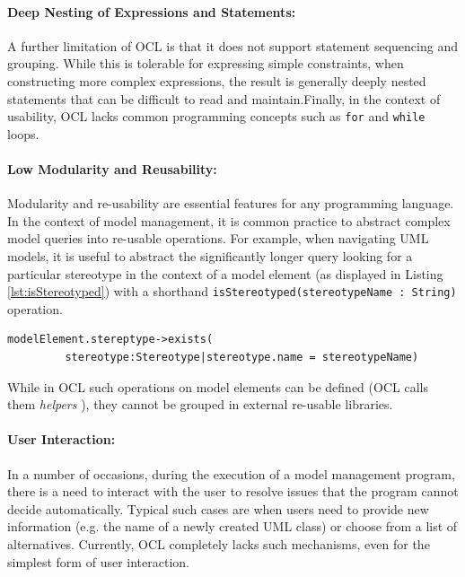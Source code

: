 \paragraph{Deep Nesting of Expressions and Statements:} A further limitation of OCL is that it does not support statement sequencing and grouping. While this is tolerable for expressing simple constraints, when constructing more complex expressions, the result is generally deeply nested statements that can be difficult to read and maintain.Finally, in the context of usability, OCL lacks common programming concepts such as \verb|for| and \verb|while| loops.

\paragraph{Low Modularity and Reusability:} Modularity and re-usability are essential features for any programming language. In the context of model management, it is common practice to abstract complex model queries into re-usable operations. For example, when navigating UML models, it is useful to abstract the significantly longer query looking for a particular stereotype in the context of a model element (as displayed in Listing \ref{lst:isStereotyped}) with a shorthand \verb|isStereotyped(stereotypeName : String)| operation. 

\begin{lstlisting}[basicstyle=\ttfamily\footnotesize, flexiblecolumns=true, flexiblecolumns=true, nolol=false, caption=Example OCL Query, label=lst:isStereotyped, language=OCL]
modelElement.stereptype->exists(
         stereotype:Stereotype|stereotype.name = stereotypeName)
\end{lstlisting}

While in OCL such operations on model elements can be defined (OCL calls them \textit{helpers} \cite{OCL}), they cannot be grouped in external re-usable libraries.

\paragraph{User Interaction:} In a number of occasions, during the execution of a model management program, there is a need to interact with the user to resolve issues that the program cannot decide automatically. Typical such cases are when users need to provide new information (e.g. the name of a newly created UML class) or choose from a list of alternatives. Currently, OCL completely lacks such mechanisms, even for the simplest form of  user interaction.\\

